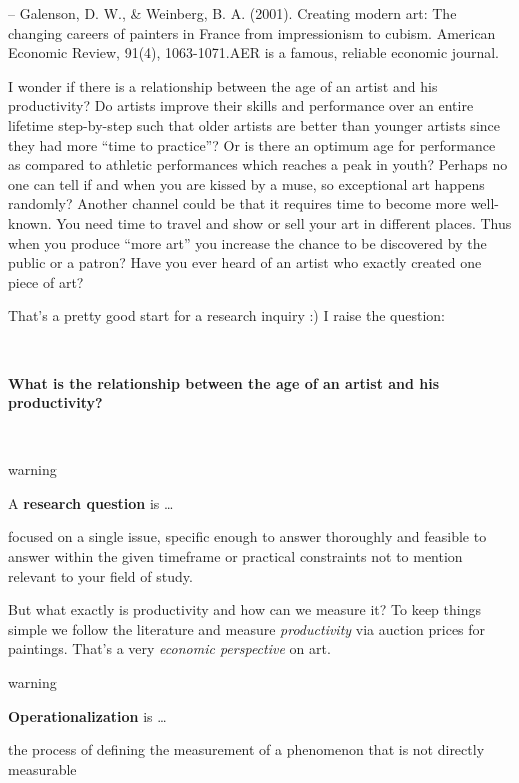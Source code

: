 \documentclass[
]{book}
\begin{document}
\hfill -- Galenson, D. W., \& Weinberg, B. A. (2001). Creating modern art: The changing careers of painters in France from impressionism to cubism. American Economic Review, 91(4), 1063-1071.AER is a famous, reliable economic journal.

I wonder if there is a relationship between the age of an artist and his productivity? Do artists improve their skills and performance over an entire lifetime step-by-step such that older artists are better than younger artists since they had more ``time to practice''? Or is there an optimum age for performance as compared to athletic performances which reaches a peak in youth? Perhaps no one can tell if and when you are kissed by a muse, so exceptional art happens randomly? Another channel could be that it requires time to become more well-known. You need time to travel and show or sell your art in different places. Thus when you produce ``more art'' you increase the chance to be discovered by the public or a patron? Have you ever heard of an artist who exactly created one piece of art?

That's a pretty good start for a research inquiry :) I raise the question:

~

\textbf{What is the relationship between the age of an artist and his productivity?}

~

\begin{infobox}warning

A \textbf{research question} is \ldots{}

focused on a single issue, specific enough to answer thoroughly and feasible to answer within the given timeframe or practical constraints not to mention relevant to your field of study.

\end{infobox}

But what exactly is productivity and how can we measure it? To keep things simple we follow the literature and measure \emph{productivity} via auction prices for paintings. That's a very \emph{economic perspective} on art.

\begin{infobox}warning

\textbf{Operationalization} is \ldots{}

the process of defining the measurement of a phenomenon that is not directly measurable

\end{infobox}
\end{document}

